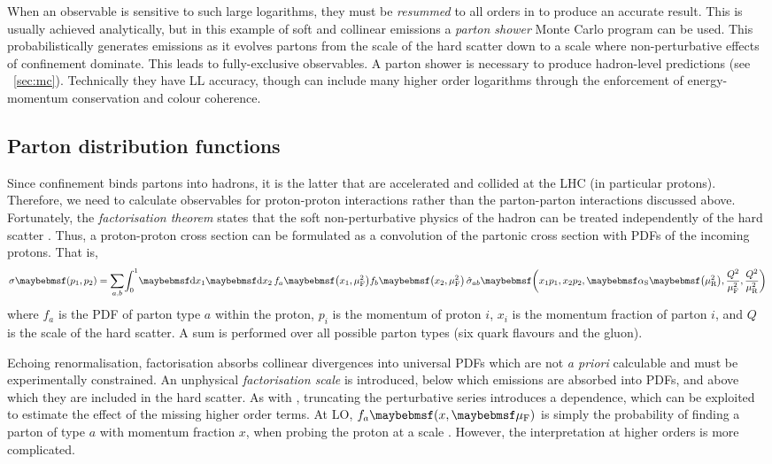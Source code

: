 When an observable is sensitive to such large logarithms, they must be \textit{resummed} 
to all orders in \alphaS to produce an accurate result. This is usually achieved 
analytically, but in this example of soft and collinear emissions a \textit{parton 
shower} Monte Carlo program can be used. This probabilistically generates emissions as it 
evolves partons from the scale of the hard scatter down to a scale where non-perturbative 
effects of confinement dominate. This leads to fully-exclusive observables. A parton 
shower is necessary to produce hadron-level predictions (see \Section~\ref{sec:mc}). 
Technically they have \ac{LL} accuracy, though can include many higher order logarithms 
through the enforcement of energy-momentum conservation and colour coherence.



\subsection{Parton distribution functions}
\label{sec:qcd:pdf}

Since confinement binds partons into hadrons, it is the latter that are accelerated and 
collided at the \acs{LHC} (in particular protons). Therefore, we need to calculate 
observables for proton-proton interactions rather than the parton-parton interactions 
discussed above. Fortunately, the \textit{factorisation theorem} states that the soft 
non-perturbative physics of the hadron can be treated independently of the hard scatter 
\cite{Collins:1982}. Thus, a proton-proton cross section can be formulated as a 
convolution of the partonic cross section with \acp{PDF} of the incoming protons. That is,
\begin{equation}
	\sigma\parenths{p_1, p_2} = 
	\sum\limits_{a, b} \! \int_0^1 \! \d{x_1} \d{x_2} \,
	f_a \parenths{x_1, \mu_{\text{F}}^2} f_b \parenths{x_2, \mu_{\text{F}}^2} \,
	\hat{\sigma}_{ab} \parenths{x_1 p_1, x_2 p_2, \alphaS\parenths{\mu_{\text{R}}^2}, 
	\frac{Q^2}{\mu_{\text{F}}^2}, \frac{Q^2}{\mu_{\text{R}}^2}} 
\end{equation}
where $f_a$ is the \ac{PDF} of parton type $a$ within the proton, $p_i$ is the momentum 
of proton $i$, $x_i$ is the momentum fraction of parton $i$, and $Q$ is the scale of the 
hard scatter. A sum is performed over all possible parton types (six quark flavours and 
the gluon).

Echoing renormalisation, factorisation absorbs collinear divergences into universal 
\acp{PDF} which are not \textit{a priori} calculable and must be experimentally 
constrained. An unphysical \textit{factorisation scale} \muf is introduced, 
below which emissions are absorbed into \acp{PDF}, and above which they are included in 
the hard scatter. As with \mur, truncating the perturbative series introduces a 
\muf dependence, which can be exploited to estimate the effect of the missing higher 
order terms. At \ac{LO}, $f_a \parenths{x, \muf}$ is simply the probability of finding a 
parton of type $a$ with momentum fraction $x$, when probing the proton at a scale \muf.
However, the interpretation at higher orders is more complicated.

